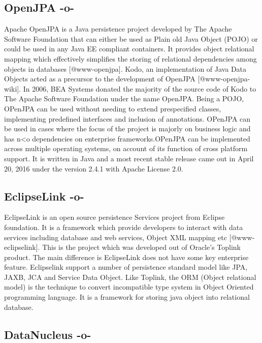 \subsection{OpenJPA -o-}

Apache OpenJPA is a Java persistence project developed by The Apache
Software Foundation that can either be used as Plain old Java Object
(POJO) or could be used in any Java EE compliant containers. It
provides object relational mapping which effectively simplifies the
storing of relational dependencies among objects in
databases [@www-openjpa].  Kodo, an implementation of Java Data
Objects acted as a precursor to the development of
OpenJPA [@www-openjpa-wiki]. In 2006, BEA Systems donated the
majority of the source code of Kodo to The Apache Software Foundation
under the name OpenJPA. Being a POJO, OPenJPA can be used without
needing to extend prespecified classes, implementing predefined
interfaces and inclusion of annotations. OPenJPA can be used in cases
where the focus of the project is majorly on business logic and has
n<o dependencies on enterprise frameworks.OPenJPA can be implemented
across multiple operating systems, on account of its function of cross
platform support. It is written in Java and a most recent stable
release came out in April 20, 2016 under the version 2.4.1 with Apache
License 2.0.



\subsection{EclipseLink -o-}

EclipseLink is an open source persistence Services project from
Eclipse foundation. It is a framework which provide developers to
interact with data services including database and web services,
Object XML mapping etc [@www-eclipselink]. This is the project
which was developed out of Oracle's Toplink product. The main
difference is EclipseLink does not have some key enterprise
feature. Eclipselink support a number of persistence standard model
like JPA, JAXB, JCA and Service Data Object. Like Toplink, the ORM
(Object relational model) is the technique to convert incompatible
type system in Object Oriented programming language. It is a framework
for storing java object into relational database.


     
\subsection{DataNucleus -o-}

